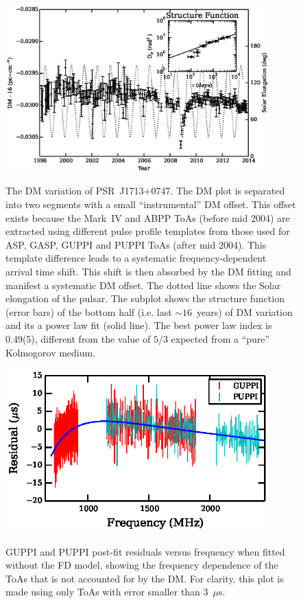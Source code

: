 \documentclass[iop,apj,tighten]{emulateapj}
\begin{document}
\begin{figure}
\includegraphics[width=4in]{DMX.ps} \\ 
\caption {\label{fig:dmx} The DM variation of PSR~J1713+0747. The DM plot is
separated into two segments with a small ``instrumental'' DM offset. This offset exists 
because the Mark~IV and ABPP ToAs (before mid 2004) are extracted using
different pulse
profile templates from those used for ASP, GASP, GUPPI and PUPPI ToAs (after
mid 2004). This template difference leads to a systematic
frequency-dependent arrival time shift. This shift is then absorbed by the DM
fitting and manifest a systematic DM offset. The dotted line shows the Solar
elongation of the pulsar. The subplot shows the structure
function (error bars) of the bottom half (i.e. last $\sim 16$~years) of DM
variation and its a power law fit (solid line). The best power law index is
0.49(5), different from the value of $5/3$ expected from a
``pure'' Kolmogorov medium. } 
\end{figure} 


\begin{figure}
\includegraphics[width=4in]{FD.ps} \\ 
\caption {\label{fig:FD} GUPPI and PUPPI post-fit residuals versus frequency when fitted
without the FD model, showing the frequency dependence of the ToAs that is 
not accounted for by the DM. For
clarity, this plot is made using only ToAs with error smaller than 3~$\mu$s.} 
\end{figure} 
\end{document}
